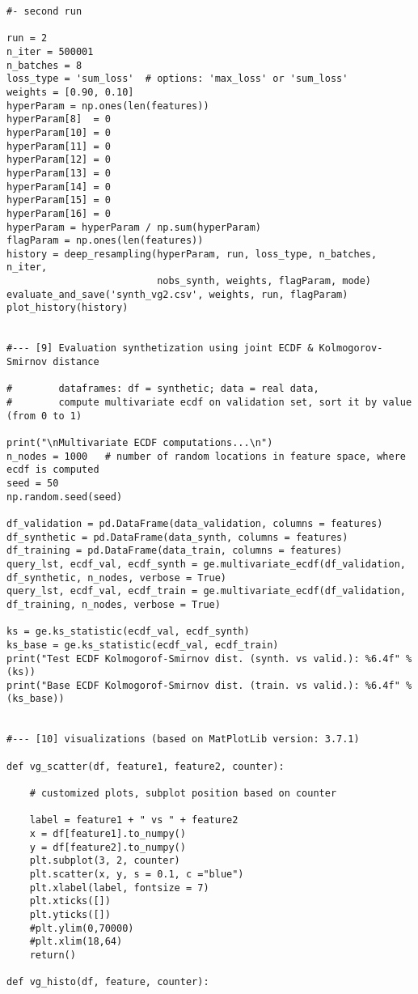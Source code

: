 \documentclass[oneside,10pt]{book}
\begin{document}
\begin{lstlisting}
#- second run

run = 2
n_iter = 500001
n_batches = 8
loss_type = 'sum_loss'  # options: 'max_loss' or 'sum_loss'
weights = [0.90, 0.10]
hyperParam = np.ones(len(features))
hyperParam[8]  = 0
hyperParam[10] = 0
hyperParam[11] = 0
hyperParam[12] = 0
hyperParam[13] = 0
hyperParam[14] = 0
hyperParam[15] = 0
hyperParam[16] = 0
hyperParam = hyperParam / np.sum(hyperParam)
flagParam = np.ones(len(features))
history = deep_resampling(hyperParam, run, loss_type, n_batches, n_iter,
                          nobs_synth, weights, flagParam, mode)
evaluate_and_save('synth_vg2.csv', weights, run, flagParam)
plot_history(history)


#--- [9] Evaluation synthetization using joint ECDF & Kolmogorov-Smirnov distance

#        dataframes: df = synthetic; data = real data,
#        compute multivariate ecdf on validation set, sort it by value (from 0 to 1)

print("\nMultivariate ECDF computations...\n")
n_nodes = 1000   # number of random locations in feature space, where ecdf is computed
seed = 50
np.random.seed(seed)

df_validation = pd.DataFrame(data_validation, columns = features)
df_synthetic = pd.DataFrame(data_synth, columns = features)
df_training = pd.DataFrame(data_train, columns = features)
query_lst, ecdf_val, ecdf_synth = ge.multivariate_ecdf(df_validation, df_synthetic, n_nodes, verbose = True)
query_lst, ecdf_val, ecdf_train = ge.multivariate_ecdf(df_validation, df_training, n_nodes, verbose = True)

ks = ge.ks_statistic(ecdf_val, ecdf_synth)
ks_base = ge.ks_statistic(ecdf_val, ecdf_train)
print("Test ECDF Kolmogorof-Smirnov dist. (synth. vs valid.): %6.4f" %(ks))
print("Base ECDF Kolmogorof-Smirnov dist. (train. vs valid.): %6.4f" %(ks_base))


#--- [10] visualizations (based on MatPlotLib version: 3.7.1)

def vg_scatter(df, feature1, feature2, counter):

    # customized plots, subplot position based on counter

    label = feature1 + " vs " + feature2
    x = df[feature1].to_numpy()
    y = df[feature2].to_numpy()
    plt.subplot(3, 2, counter)
    plt.scatter(x, y, s = 0.1, c ="blue")
    plt.xlabel(label, fontsize = 7)
    plt.xticks([])
    plt.yticks([])
    #plt.ylim(0,70000)
    #plt.xlim(18,64)
    return()

def vg_histo(df, feature, counter):


\end{lstlisting}
\end{document}

